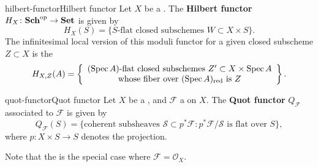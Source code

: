 \begin{topic}{hilbert-functor}{Hilbert functor}
    Let $X$ be a . The \textbf{Hilbert functor} $H_X \colon \textbf{Sch}^\textup{op} \to \textbf{Set}$ is given by
    \[ H_X(S) = \{ \text{$S$-flat closed subschemes $W \subset X \times S$} \} . \]
    The infinitesimal local version of this moduli functor for a given closed subscheme $Z \subset X$ is the 
    \[ H_{X, Z}(A) = \left\{ \begin{array}{cc} \text{$(\operatorname{Spec} A)$-flat closed subschemes $Z' \subset X \times \operatorname{Spec} A$} \\ \text{whose fiber over $(\operatorname{Spec} A)_\textup{red}$ is $Z$} \end{array} \right\} . \]
\end{topic}

\begin{topic}{quot-functor}{Quot functor}
    Let $X$ be a , and $\mathcal{F}$ a  on $X$. The \textbf{Quot functor} $Q_\mathcal{F}$ associated to $\mathcal{F}$ is given by
    \[ Q_\mathcal{F}(S) = \{ \text{coherent subsheaves } \mathcal{S} \subset p^* \mathcal{F} : p^* \mathcal{F} / \mathcal{S} \text{ is flat over } S \} , \]
    where $p \colon X \times S \to S$ denotes the projection.
    
    Note that the  is the special case where $\mathcal{F} = \mathcal{O}_X$.
\end{topic}
